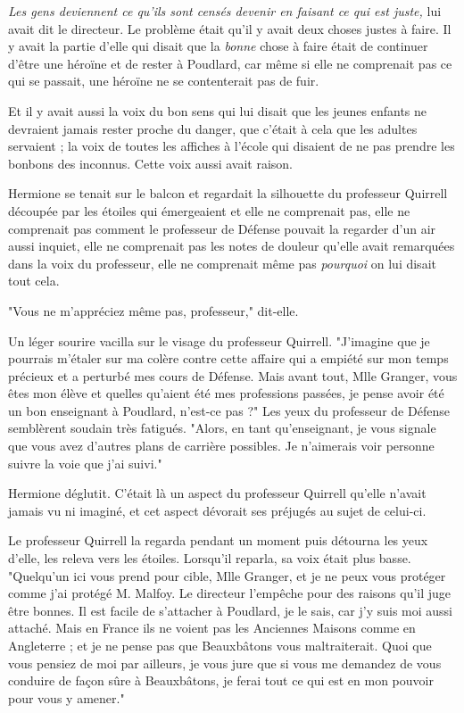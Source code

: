\emph{Les gens deviennent ce qu'ils sont censés devenir en faisant ce qui est juste,}  lui avait dit le directeur. Le problème était qu'il y avait deux choses justes à faire. Il y avait la partie d'elle qui disait que la \emph{bonne}  chose à faire était de continuer d'être une héroïne et de rester à Poudlard, car même si elle ne comprenait pas ce qui se passait, une héroïne ne se contenterait pas de fuir.

Et il y avait aussi la voix du bon sens qui lui disait que les jeunes enfants ne devraient jamais rester proche du danger, que c'était à cela que les adultes servaient ; la voix de toutes les affiches à l'école qui disaient de ne pas prendre les bonbons des inconnus. Cette voix aussi avait raison.

Hermione se tenait sur le balcon et regardait la silhouette du professeur Quirrell découpée par les étoiles qui émergeaient et elle ne comprenait pas, elle ne comprenait pas comment le professeur de Défense pouvait la regarder d'un air aussi inquiet, elle ne comprenait pas les notes de douleur qu'elle avait remarquées dans la voix du professeur, elle ne comprenait même pas \emph{pourquoi}  on lui disait tout cela.

"Vous ne m'appréciez même pas, professeur," dit-elle.

Un léger sourire vacilla sur le visage du professeur Quirrell. "J'imagine que je pourrais m'étaler sur ma colère contre cette affaire qui a empiété sur mon temps précieux et a perturbé mes cours de Défense. Mais avant tout, Mlle Granger, vous êtes mon élève et quelles qu'aient été mes professions passées, je pense avoir été un bon enseignant à Poudlard, n'est-ce pas ?" Les yeux du professeur de Défense semblèrent soudain très fatigués. "Alors, en tant qu'enseignant, je vous signale que vous avez d'autres plans de carrière possibles. Je n'aimerais voir personne suivre la voie que j'ai suivi."

Hermione déglutit. C'était là un aspect du professeur Quirrell qu'elle n'avait jamais vu ni imaginé, et cet aspect dévorait ses préjugés au sujet de celui-ci.

Le professeur Quirrell la regarda pendant un moment puis détourna les yeux d'elle, les releva vers les étoiles. Lorsqu'il reparla, sa voix était plus basse. "Quelqu'un ici vous prend pour cible, Mlle Granger, et je ne peux vous protéger comme j'ai protégé M. Malfoy. Le directeur l'empêche pour des raisons qu'il juge être bonnes. Il est facile de s'attacher à Poudlard, je le sais, car j'y suis moi aussi attaché. Mais en France ils ne voient pas les Anciennes Maisons comme en Angleterre ; et je ne pense pas que Beauxbâtons vous maltraiterait. Quoi que vous pensiez de moi par ailleurs, je vous jure que si vous me demandez de vous conduire de façon sûre à Beauxbâtons, je ferai tout ce qui est en mon pouvoir pour vous y amener."

